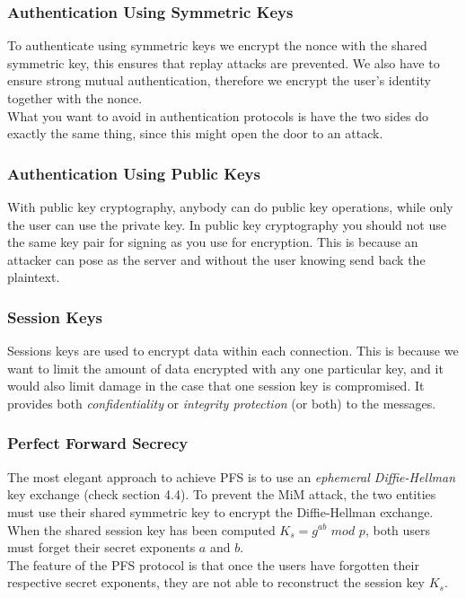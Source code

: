 \documentclass[a4paper]{article}
\begin{document}
\subsubsection{Authentication Using Symmetric Keys}
To authenticate using symmetric keys we encrypt the nonce with the shared symmetric key, this ensures that  replay attacks are prevented. We also have to ensure strong mutual authentication, therefore we encrypt the user's identity together with the nonce.\\
What you want to avoid in authentication protocols is have the two sides do exactly the same thing, since this might open the door to an attack.

\subsubsection{Authentication Using Public Keys}
With public key cryptography, anybody can do public key operations, while only the user can use the private key. In public key cryptography you should not use the same key pair for signing as you use for encryption. This is because an attacker can pose as the server and without the user knowing send back the plaintext.

\subsubsection{Session Keys}
Sessions keys are used to encrypt data within each connection. This is because we want to limit the amount of data encrypted with any one particular key, and it would also limit damage in the case that one session key is compromised. It provides both \textit{confidentiality} or \textit{integrity protection} (or both) to the messages.

\subsubsection{Perfect Forward Secrecy}
The most elegant approach to achieve PFS is to use an \textit{ephemeral Diffie-Hellman} key exchange (check section 4.4). To prevent the MiM attack, the two entities must use their shared symmetric key to encrypt the Diffie-Hellman exchange. When the shared session key has been computed $K_s = g^{ab}$ $mod$ $p$, both users must forget their secret exponents $a$ and $b$.\\
The feature of the PFS protocol is that once the users have forgotten their respective secret exponents, they are not able to reconstruct the session key $K_s$.
\end{document}
